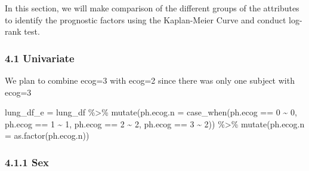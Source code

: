 \documentclass[
]{article}
\newenvironment{Shaded}{\begin{snugshade}}{\end{snugshade}}
\newcommand{\AttributeTok}[1]{\textcolor[rgb]{0.77,0.63,0.00}{#1}}
\newcommand{\CommentTok}[1]{\textcolor[rgb]{0.56,0.35,0.01}{\textit{#1}}}
\newcommand{\DecValTok}[1]{\textcolor[rgb]{0.00,0.00,0.81}{#1}}
\newcommand{\FunctionTok}[1]{\textcolor[rgb]{0.00,0.00,0.00}{#1}}
\newcommand{\NormalTok}[1]{#1}
\newcommand{\OtherTok}[1]{\textcolor[rgb]{0.56,0.35,0.01}{#1}}
\newcommand{\SpecialCharTok}[1]{\textcolor[rgb]{0.00,0.00,0.00}{#1}}
\newcommand{\StringTok}[1]{\textcolor[rgb]{0.31,0.60,0.02}{#1}}
\begin{document}
In this section, we will make comparison of the different groups of the
attributes to identify the prognostic factors using the Kaplan-Meier
Curve and conduct log-rank test.

\hypertarget{univariate}{%
\subsubsection{4.1 Univariate}\label{univariate}}

We plan to combine ecog=3 with ecog=2 since there was only one subject
with ecog=3

\begin{Shaded}
\begin{Highlighting}[]
\NormalTok{lung\_df\_e }\OtherTok{=}\NormalTok{ lung\_df }\SpecialCharTok{\%\textgreater{}\%}
  \FunctionTok{mutate}\NormalTok{(}\AttributeTok{ph.ecog.n =} \FunctionTok{case\_when}\NormalTok{(ph.ecog }\SpecialCharTok{==} \DecValTok{0} \SpecialCharTok{\textasciitilde{}} \DecValTok{0}\NormalTok{,}
\NormalTok{                               ph.ecog }\SpecialCharTok{==} \DecValTok{1} \SpecialCharTok{\textasciitilde{}} \DecValTok{1}\NormalTok{,}
\NormalTok{                               ph.ecog }\SpecialCharTok{==} \DecValTok{2} \SpecialCharTok{\textasciitilde{}} \DecValTok{2}\NormalTok{,}
\NormalTok{                               ph.ecog }\SpecialCharTok{==} \DecValTok{3} \SpecialCharTok{\textasciitilde{}} \DecValTok{2}\NormalTok{)) }\SpecialCharTok{\%\textgreater{}\%}
  \FunctionTok{mutate}\NormalTok{(}\AttributeTok{ph.ecog.n =} \FunctionTok{as.factor}\NormalTok{(ph.ecog.n))}
\end{Highlighting}
\end{Shaded}

\hypertarget{sex}{%
\subsubsection{4.1.1 Sex}\label{sex}}

\begin{Shaded}
\end{Shaded}
\end{document}
